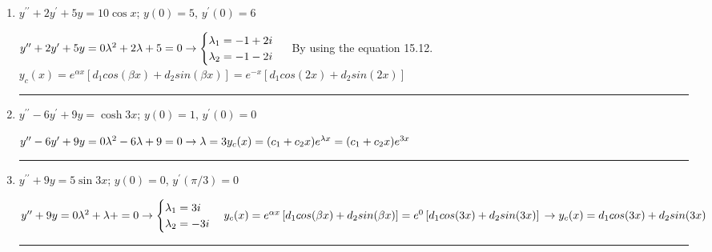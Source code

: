 \documentclass[fleqn]{article}
\begin{document}
\begin{enumerate}
\begin{enumerate}
        \textcolor{hwColor}{ 
          \rule{15cm}{1pt} 
        }
  
      \item $y^{\prime \prime }+2y^{\prime }+5y=10\cos x$; $y\left( 0\right) =5$, $y^{\prime }\left( 0\right) =6$
      
        \textcolor{hwColor}{
          $
            y^{\prime \prime }+2y^{\prime }+5y=0 \\
            \\
            \lambda^2+2\lambda+5=0 \rightarrow \begin{cases}
              \lambda_1=-1+2i \\
              \lambda_2=-1-2i
            \end{cases} \\
          $
          By using the equation 15.12.  \\
          $
            y_c(x)=e^{\alpha x}\left[d_1 cos(\beta x)+d_2 sin(\beta x)\right]=e^{-x}\left[d_1 cos(2x)+d_2 sin(2x)\right]
          $
        }

        \textcolor{hwColor}{ 
          \rule{15cm}{1pt} 
        }

      \item $y^{\prime \prime }-6y^{\prime }+9y=\cosh 3x$; $y\left( 0\right) =1$, $y^{\prime }\left( 0\right) =0$
      
        \textcolor{hwColor}{
          $
            y^{\prime \prime }-6y^{\prime }+9y=0 \\
            \\
            \lambda^2-6\lambda+9=0 \rightarrow \lambda=3
            \\
            y_c(x)=(c_1+c_2 x)e^{\lambda x}=(c_1+c_2 x)e^{3x}
          $
        }

        \textcolor{hwColor}{ 
          \rule{15cm}{1pt} 
        }

      \item $y^{\prime \prime }+9y=5\sin 3x$; $y\left( 0\right) =0$, $y^{\prime}\left( \pi/3\right) =0$

        \textcolor{hwColor}{
          $
            y^{\prime \prime }+9y=0 \\
            \\
            \lambda^2+\lambda+=0 \rightarrow \begin{cases}
              \lambda_1=3i \\
              \lambda_2=-3i
            \end{cases} \\
            \\
            y_c(x)=e^{\alpha x}\left[d_1 cos(\beta x)+d_2 sin(\beta x)\right]=e^{0}\left[d_1 cos(3x)+d_2 sin(3x)\right] \\
            \rightarrow y_c(x)=d_1 cos(3x)+d_2 sin(3x) \\
          $
        }
        \textcolor{hwColor}{ 
          \rule{15cm}{1pt} 
        }


\end{enumerate}
\end{enumerate}
\end{document}
